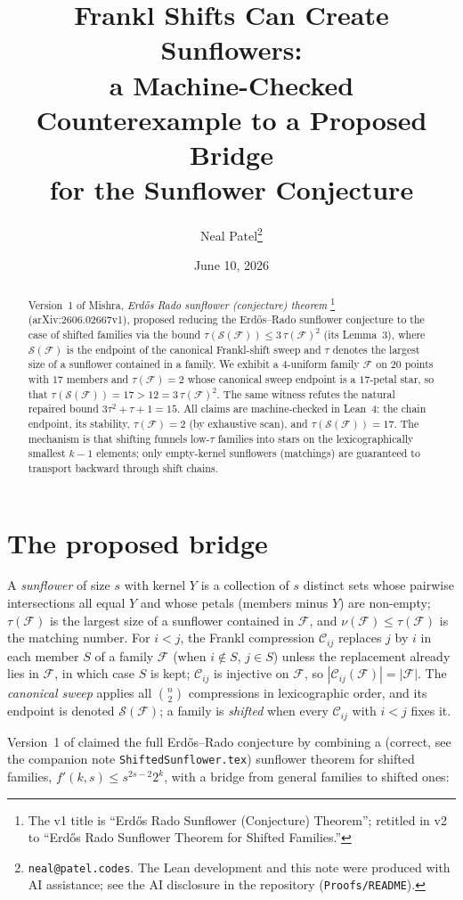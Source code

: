 \documentclass[11pt,a4paper]{article}
\title{Frankl Shifts Can Create Sunflowers:\\
  a Machine-Checked Counterexample to a Proposed Bridge\\
  for the Sunflower Conjecture}
\author{Neal Patel\thanks{\texttt{neal@patel.codes}. The Lean development
  and this note were produced with AI assistance; see the AI disclosure in
  the repository (\texttt{Proofs/README}).}}
\date{June 10, 2026}
\theoremstyle{remark}
\newcommand{\cC}{\mathcal{C}}
\newcommand{\cF}{\mathcal{F}}
\newcommand{\cS}{\mathcal{S}}
\begin{document}
\maketitle

\begin{abstract}
Version~1 of Mishra, \emph{Erd\H{o}s Rado sunflower (conjecture)
theorem}%
\footnote{The v1 title is ``Erd\H{o}s Rado Sunflower (Conjecture) Theorem'';
  retitled in v2 to ``Erd\H{o}s Rado Sunflower Theorem for Shifted Families.''}
(arXiv:2606.02667v1), proposed reducing the Erd\H{o}s--Rado
sunflower conjecture to the case of shifted families via the bound
$\tau(\cS(\cF))\le3\,\tau(\cF)^{2}$ (its Lemma~3), where $\cS(\cF)$ is
the endpoint of the canonical Frankl-shift sweep and $\tau$ denotes the
largest size of a sunflower contained in a family. We exhibit a
$4$-uniform family $\cF$ on $20$ points with $17$ members and
$\tau(\cF)=2$ whose canonical sweep endpoint is a $17$-petal star, so
that $\tau(\cS(\cF))=17>12=3\,\tau(\cF)^{2}$. The same witness refutes
the natural repaired bound $3\tau^{2}+\tau+1=15$. All claims are
machine-checked in Lean~4: the chain endpoint, its stability,
$\tau(\cF)=2$ (by exhaustive scan), and $\tau(\cS(\cF))=17$. The
mechanism is that shifting funnels low-$\tau$ families into stars on
the lexicographically smallest $k-1$ elements; only empty-kernel
sunflowers (matchings) are guaranteed to transport backward through
shift chains.
\end{abstract}

\section{The proposed bridge}

A \emph{sunflower} of size $s$ with kernel $Y$ is a collection of $s$
distinct sets whose pairwise intersections all equal $Y$ and whose
petals (members minus $Y$) are non-empty; $\tau(\cF)$ is the largest
size of a sunflower contained in $\cF$, and $\nu(\cF)\le\tau(\cF)$ is
the matching number. For $i<j$, the Frankl compression $\cC_{ij}$
\cite{Fr87} replaces $j$ by $i$ in each member $S$ of a family $\cF$
(when $i\notin S$, $j\in S$) unless the replacement already lies in
$\cF$, in which case $S$ is kept; $\cC_{ij}$ is injective on $\cF$, so
$|\cC_{ij}(\cF)|=|\cF|$. The \emph{canonical sweep} applies all
$\binom{n}{2}$ compressions in lexicographic order, and its endpoint
is denoted $\cS(\cF)$; a family is \emph{shifted} when every
$\cC_{ij}$ with $i<j$ fixes it.

Version~1 of \cite{Mi26} claimed the full Erd\H{o}s--Rado conjecture
\cite{ER60} by combining a (correct, see the companion note
\texttt{ShiftedSunflower.tex}) sunflower theorem for shifted families,
$f'(k,s)\le s^{2s-2}2^{k}$, with a bridge from general families to
shifted ones:
\end{document}
